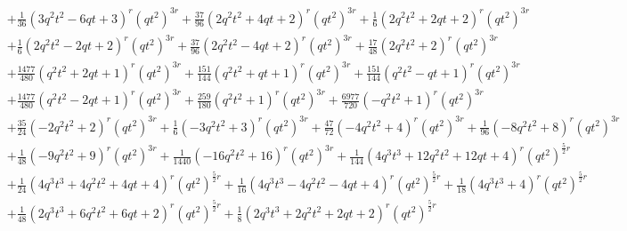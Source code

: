 \documentclass[11pt,english]{amsart}
\numberwithin{equation}{section}
\numberwithin{figure}{section}
\theoremstyle{plain}
\theoremstyle{plain}
\theoremstyle{definition}
\theoremstyle{remark}
\begin{document}
{\begin{align*}
& + \frac{1}{36}  {\left(3  q^{2} t^{2} - 6  q t + 3\right)}^{r} \left(q t^{2}\right)^{3  r} + \frac{37}{96}  {\left(2  q^{2} t^{2} + 4  q t + 2\right)}^{r} \left(q t^{2}\right)^{3  r} + \frac{1}{6}  {\left(2  q^{2} t^{2} + 2  q t + 2\right)}^{r} \left(q t^{2}\right)^{3  r} \\
& + \frac{1}{6}  {\left(2  q^{2} t^{2} - 2  q t + 2\right)}^{r} \left(q t^{2}\right)^{3  r} + \frac{37}{96}  {\left(2  q^{2} t^{2} - 4  q t + 2\right)}^{r} \left(q t^{2}\right)^{3  r} + \frac{17}{48}  {\left(2  q^{2} t^{2} + 2\right)}^{r} \left(q t^{2}\right)^{3  r} \\
& + \frac{1477}{480}  {\left(q^{2} t^{2} + 2  q t + 1\right)}^{r} \left(q t^{2}\right)^{3  r} + \frac{151}{144}  {\left(q^{2} t^{2} + q t + 1\right)}^{r} \left(q t^{2}\right)^{3  r} + \frac{151}{144}  {\left(q^{2} t^{2} - q t + 1\right)}^{r} \left(q t^{2}\right)^{3  r} \\
& + \frac{1477}{480}  {\left(q^{2} t^{2} - 2  q t + 1\right)}^{r} \left(q t^{2}\right)^{3  r} + \frac{259}{180}  {\left(q^{2} t^{2} + 1\right)}^{r} \left(q t^{2}\right)^{3  r} + \frac{6977}{720}  {\left(-q^{2} t^{2} + 1\right)}^{r} \left(q t^{2}\right)^{3  r} \\
& + \frac{35}{24}  {\left(-2  q^{2} t^{2} + 2\right)}^{r} \left(q t^{2}\right)^{3  r} + \frac{1}{6}  {\left(-3  q^{2} t^{2} + 3\right)}^{r} \left(q t^{2}\right)^{3  r} + \frac{47}{72}  {\left(-4  q^{2} t^{2} + 4\right)}^{r} \left(q t^{2}\right)^{3  r} + \frac{1}{96}  {\left(-8  q^{2} t^{2} + 8\right)}^{r} \left(q t^{2}\right)^{3  r} \\
& + \frac{1}{48}  {\left(-9  q^{2} t^{2} + 9\right)}^{r} \left(q t^{2}\right)^{3  r} + \frac{1}{1440}  {\left(-16  q^{2} t^{2} + 16\right)}^{r} \left(q t^{2}\right)^{3  r} + \frac{1}{144}  {\left(4  q^{3} t^{3} + 12  q^{2} t^{2} + 12  q t + 4\right)}^{r} \left(q t^{2}\right)^{\frac{5}{2}  r} \\
& + \frac{1}{24}  {\left(4  q^{3} t^{3} + 4  q^{2} t^{2} + 4  q t + 4\right)}^{r} \left(q t^{2}\right)^{\frac{5}{2}  r} + \frac{1}{16}  {\left(4  q^{3} t^{3} - 4  q^{2} t^{2} - 4  q t + 4\right)}^{r} \left(q t^{2}\right)^{\frac{5}{2}  r} + \frac{1}{18}  {\left(4  q^{3} t^{3} + 4\right)}^{r} \left(q t^{2}\right)^{\frac{5}{2}  r} \\
& + \frac{1}{48}  {\left(2  q^{3} t^{3} + 6  q^{2} t^{2} + 6  q t + 2\right)}^{r} \left(q t^{2}\right)^{\frac{5}{2}  r} + \frac{1}{8}  {\left(2  q^{3} t^{3} + 2  q^{2} t^{2} + 2  q t + 2\right)}^{r} \left(q t^{2}\right)^{\frac{5}{2}  r} \\

\end{align*}}
\end{document}
